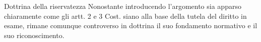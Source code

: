 \begin{comment}\subsection{Identità personale e riservatezza - analisi e parallelismi}%
Le similitudini presenti fra l'interesse all'identità personale e quello alla riservatezza sono piuttosto evidenti, a causa anche della comunanza dei precetti che li tutelano. Tuttavia, una sottile differenza si nota analizzando come, in realtà, questi siano due beni diversi, seppur tutelati dalle stesse fonti: il punto cardine dell'identità personale, infatti, è il concetto di \textit{verità}, di \textit{assicurare la fedeltà della rappresentazione della persona}\footnote{DE CUPIS A., \textit{I diritti della personalità}, Giuffrè, 1982.}, mentre invece nei confronti della riservatezza il fulcro si rinviene nel concetto di \textit{consenso}, volto ad assicurare la \textit{non rappresentazione} della vita privata senza una volontà, esplicita o implicita, dell'interessato. 
Pertanto la lesione del diritto alla riservatezza, dipende prima di tutto dalla rappresentazione stessa, in sè e per sè considerata, del soggetto medesimo; e anzi tanto più è fedele tale raffigurazione, tanto più viene inficiato questo diritto. In questo senso appare decisamente più chiaro come la suesposta comunanza di norme comporti una coincidenza di istituti soltanto parziale, poichè in realtà la lesione dell'uno comporta spesso la \textit{non lesione} dell'altro diritto, salvi ovviamente i casi di ipotesi cumulativa, in cui oltre a mancare il consenso alla rappresentazione della persona, questa venga effettuata oltretutto in maniera non aderente alla verità personale. Possono considerarsi quindi connessi, seppure potenzialmente alternativi, in quanto se la rappresentazione non viene autorizzata, ogni eventuale divergenza comporta una situazione di illegittimità; se invece la rappresentazione viene consentita, questa risulta legittima soltanto in quanto fedele alla verità, così da evitare si lesionare il diritto all'identità personale o altri diritti della personalità connessi alla fattispecie,  quali l'immagine, l'onore o la reputazione, di cui già si è avuto modo di trattare.
\end{comment}
{Dottrina della riservatezza}
Nonostante introducendo l'argomento sia apparso chiaramente come gli artt. 2 e 3 Cost. siano alla base della tutela del diritto in esame, rimane comunque controverso in dottrina il suo fondamento normativo e il suo riconoscimento. 
